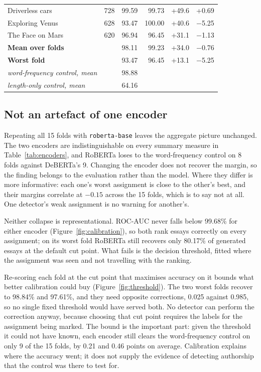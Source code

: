 \documentclass[11pt,a4paper]{article}
\begin{document}
\begin{table}[tb]
\begin{tabular}{@{}lrrrrr@{}}
Driverless cars                       &    728 & 99.59 & 99.73 & +49.6 & +0.69 \\
Exploring Venus                       &    628 & 93.47 & 100.00 & +40.6 & $-$5.25 \\
The Face on Mars                      &    620 & 96.94 & 96.45 & +31.1 & $-$1.13 \\
\midrule
\textbf{Mean over folds}              &        & 98.11 & 99.23 & +34.0 & $-$0.76 \\
\textbf{Worst fold}                   &        & 93.47 & 96.45 & +13.1 & $-$5.25 \\
\midrule
\emph{word-frequency control, mean}   &        & 98.88 & & & \\
\emph{length-only control, mean}      &        & 64.16 & & & \\
\bottomrule
\end{tabular}
\end{table}

\subsection{Not an artefact of one encoder}

Repeating all 15 folds with \texttt{roberta-base} leaves the aggregate
picture unchanged. The two encoders are indistinguishable on every summary
measure in Table~\ref{tab:encoders}, and RoBERTa loses to the
word-frequency control on 8 folds against DeBERTa's 9. Changing the encoder
does not recover the margin, so the finding belongs to the evaluation
rather than the model. Where they differ is more informative: each one's
worst assignment is close to the other's best, and their margins correlate
at $-0.15$ across the 15 folds, which is to say not at all. One detector's
weak assignment is no warning for another's.

Neither collapse is representational. ROC-AUC never falls below 99.68\% for
either encoder (Figure~\ref{fig:calibration}), so both rank essays
correctly on every assignment; on its worst fold RoBERTa still recovers only
80.17\% of generated essays at the default cut point. What fails is the
decision threshold, fitted where the assignment was seen and not travelling
with the ranking.

Re-scoring each fold at the cut point that maximises accuracy on it bounds
what better calibration could buy (Figure~\ref{fig:threshold}). The two
worst folds recover to 98.84\% and 97.61\%, and they need opposite
corrections, 0.025 against 0.985, so no single fixed threshold would have
served both. No detector can perform the correction anyway, because
choosing that cut point requires the labels for the assignment being
marked. The bound is the important part: given the threshold it could not
have known, each encoder still clears the word-frequency control on only 9
of the 15 folds, by 0.21 and 0.46 points on average. Calibration explains
where the accuracy went; it does not supply the evidence of detecting
authorship that the control was there to test for.
\end{document}

